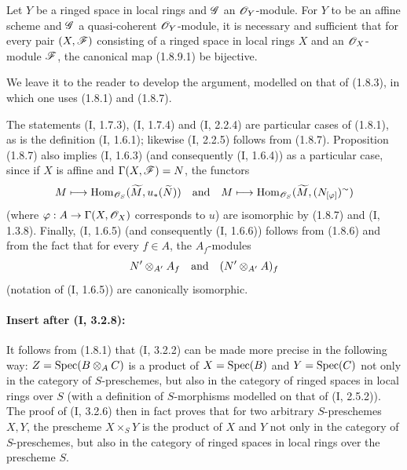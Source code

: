 \begin{corollary}[1.8.10]
\label{ega2:addendum:I.1.8.10}
Let $Y$ be a ringed space in local rings and $\mathscr{G}$ an
$\mathscr{O}_Y$-module. For $Y$ to be an affine scheme and $\mathscr{G}$ a
quasi-coherent $\mathscr{O}_Y$-module, it is necessary and sufficient that for
every pair $(X,\mathscr{F})$ consisting of a ringed space in local rings $X$
and an $\mathscr{O}_X$-module $\mathscr{F}$, the canonical map (1.8.9.1) be
bijective.
\end{corollary}

We leave it to the reader to develop the argument, modelled
on that of (1.8.3), in which one uses (1.8.1) and (1.8.7).

\begin{remark}[1.8.11]
\label{ega2:addendum:I.1.8.11}
The statements (I, 1.7.3), (I, 1.7.4) and (I, 2.2.4) are particular
cases of (1.8.1), as is the definition (I, 1.6.1); likewise
(I, 2.2.5) follows from (1.8.7). Proposition (1.8.7) also implies
(I, 1.6.3) (and consequently (I, 1.6.4)) as a particular case, since if $X$
is affine and $\Gamma(X,\mathscr{F})=N$, the functors
\[
  M\longmapsto
  \operatorname{Hom}_{\mathscr{O}_S}(\widetilde M,u_*(\widetilde N))
  \quad\hbox{and}\quad
  M\longmapsto
  \operatorname{Hom}_{\mathscr{O}_S}(\widetilde M,(N_{[\varphi]})^{\sim})
\]
(where $\varphi:A\to\Gamma(X,\mathscr{O}_X)$ corresponds to $u$) are isomorphic
by (1.8.7) and (I, 1.3.8). Finally, (I, 1.6.5) (and consequently (I, 1.6.6))
follows from (1.8.6) and from the fact that for every $f\in A$, the
$A_f$-modules
\[
  N'\otimes_{A'}A_f
  \quad\hbox{and}\quad
  (N'\otimes_{A'}A)_f
\]
(notation of (I, 1.6.5)) are canonically isomorphic.
\end{remark}

\paragraph{Insert after (I, 3.2.8):}

\begin{env}[3.2.9]
\label{ega2:addendum:I.3.2.9}
It follows from (1.8.1) that (I, 3.2.2) can be made more precise in the
following way: $Z=\operatorname{Spec}(B\otimes_A C)$ is a product of
$X=\operatorname{Spec}(B)$ and $Y=\operatorname{Spec}(C)$ not only in the category of $S$-preschemes,
but also in the category of ringed spaces in local rings
over $S$ (with a definition of $S$-morphisms modelled on
that of (I, 2.5.2)). The proof of (I, 3.2.6) then in fact proves
that for two arbitrary $S$-preschemes $X,Y$, the prescheme
$X\times_S Y$ is the product of $X$ and $Y$ not only in the
category of $S$-preschemes, but also in the category of ringed
spaces in local rings over the prescheme $S$.
\end{env}

